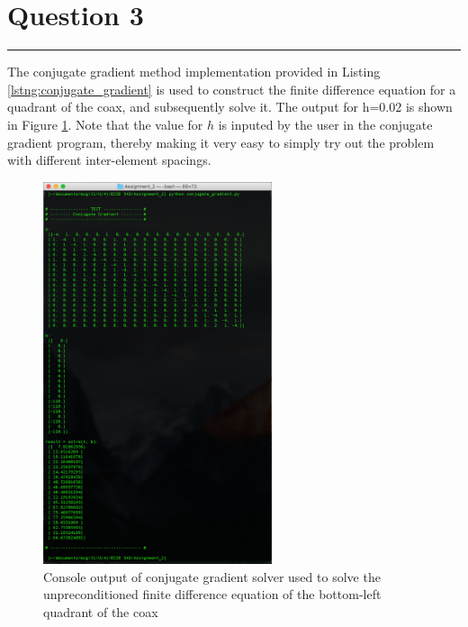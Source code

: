 \documentclass[11pt]{amsart}
\begin{document}
\section*{Question 3}
\vspace*{-0.2in}
\noindent\rule{\textwidth}{0.4pt}
The conjugate gradient method implementation provided in Listing \ref{lstng:conjugate_gradient} is used to construct the finite difference equation for a quadrant of the coax, and subsequently solve it. The output for h=0.02 is shown in Figure \ref{fig:q3_cg}. Note that the value for $h$ is inputed by the user in the conjugate gradient program, thereby making it very easy to simply try out the problem with different inter-element spacings.
\begin{figure}[h!]
    \includegraphics[width=0.6\textwidth]{assets/conjugate_gradient}
    \caption{Console output of conjugate gradient solver used to solve the unpreconditioned finite difference equation of the bottom-left quadrant of the coax}
    \label{fig:q3_cg}
\end{figure}

\pagebreak
\end{document}
